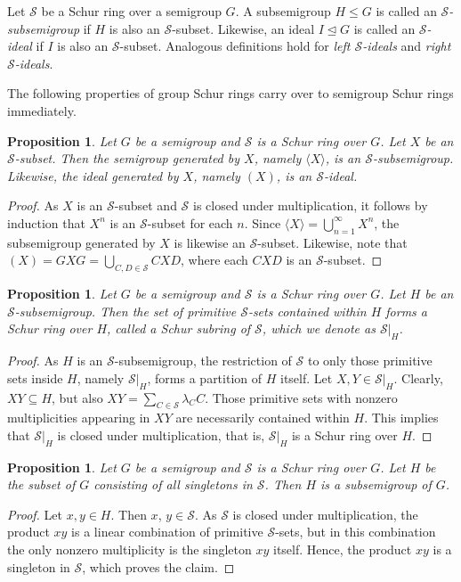 \documentclass{article}
\theoremstyle{plain}
\newtheorem{Prop}[Thm]{Proposition}
\theoremstyle{definition}
\renewcommand{\S}{\mathcal{S}}
\begin{document}
Let $\S$ be a Schur ring over a semigroup $G$.  A subsemigroup $H\le G$ is called an \emph{$\S$-subsemigroup} if $H$ is also an $\S$-subset. Likewise, an ideal $I\trianglelefteq G$ is called an \emph{$\S$-ideal} if $I$ is also an $\S$-subset. Analogous definitions hold for \emph{left $\S$-ideals} and \emph{right $\S$-ideals}.

The following properties of group Schur rings carry over to semigroup Schur rings immediately.

\begin{Prop} Let $G$ be a semigroup and $\S$ is a Schur ring over $G$. Let $X$ be an $\S$-subset. Then the semigroup generated by $X$, namely $\langle X\rangle$, is an $\S$-subsemigroup. Likewise, the ideal generated by $X$, namely $(X)$, is an $\S$-ideal.
\end{Prop}
\begin{proof}
    As $X$ is an $\S$-subset and $\S$ is closed under multiplication, it follows by induction that $X^n$ is an $\S$-subset for each $n$. Since $\langle X\rangle = \bigcup_{n=1}^\infty X^n$, the subsemigroup generated by $X$ is likewise an $\S$-subset. Likewise, note that $(X) = GXG = \bigcup_{C,D\in \S} CXD$, where each $CXD$ is an $\S$-subset.
\end{proof}

\begin{Prop}\label{prop:subring} Let $G$ be a semigroup and $\S$ is a Schur ring over $G$. Let $H$ be an $\S$-subsemigroup. Then the set of primitive $\S$-sets contained within $H$ forms a Schur ring over $H$, called a Schur subring of $\S$, which we denote as $\S|_H$.
\end{Prop}
\begin{proof}
    As $H$ is an $\S$-subsemigroup, the restriction of $\S$ to only those primitive sets inside $H$, namely $\S|_H$, forms a partition of $H$ itself. Let $X,Y\in \S|_H$. Clearly, $XY\subseteq H$, but also $XY = \sum_{C\in \S} \lambda_CC$. Those primitive sets with nonzero multiplicities appearing in $XY$ are necessarily contained within $H$. This implies that $\S|_H$ is closed under multiplication, that is, $\S|_H$ is a Schur ring over $H$.
\end{proof}

\begin{Prop}\label{prop:singleton} Let $G$ be a semigroup and $\S$ is a Schur ring over $G$. Let $H$ be the subset of $G$ consisting of all singletons in $\S$. Then $H$ is a subsemigroup of $G$.    
\end{Prop}
\begin{proof}
    Let $x,y\in H$. Then $x$, $y\in \S$. As $\S$ is closed under multiplication, the product $xy$ is a linear combination of primitive $\S$-sets, but in this combination the only nonzero multiplicity is the singleton $xy$ itself. Hence, the product $xy$ is a singleton in $\S$, which proves the claim.
\end{proof}
\end{document}
